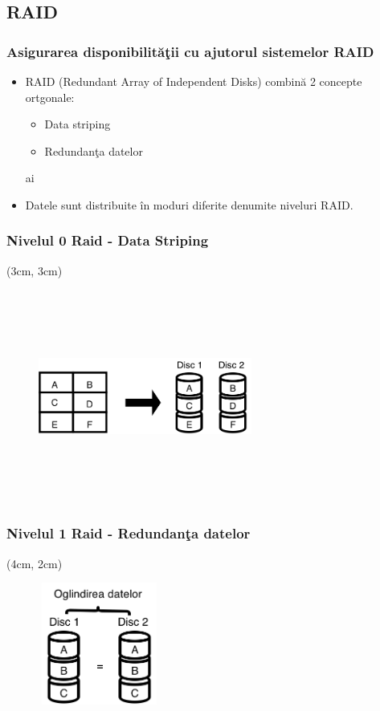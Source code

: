 \documentclass{beamer}
\theoremstyle{definition}
\begin{document}
\subsection{RAID}
\begin{frame}
    \frametitle{Asigurarea disponibilit\u{a}\c{t}ii cu ajutorul sistemelor RAID}
    \begin{itemize}
        \item RAID (Redundant Array of Independent Disks) combin\u{a} 2 concepte ortgonale:
        \pause
            \begin{itemize}
                \item Data striping
                \pause
                \item Redundan\c{t}a datelor 
            \end{itemize} ai 
        \pause
        \item Datele sunt distribuite \^{i}n moduri diferite denumite niveluri RAID.
    \end{itemize}
\end{frame}
\begin{frame}
    \frametitle{Nivelul 0 Raid - Data Striping}
    \begin{textblock*}{4cm}(3cm, 3cm)
        \begin{figure}
            \includegraphics[width=7cm,height=7cm,keepaspectratio]{img/raid/raid0.png}
       \end{figure}
    \end{textblock*}  
\end{frame}

\begin{frame}
    \frametitle{Nivelul 1 Raid - Redundan\c{t}a datelor}
    \begin{textblock*}{4cm}(4cm, 2cm)
        \begin{figure}
            \includegraphics[width=4cm,height=4cm,keepaspectratio]{img/raid/raid1.png}

            \caption{}
       \end{figure}
    \end{textblock*}  
\end{frame}
\end{document}
